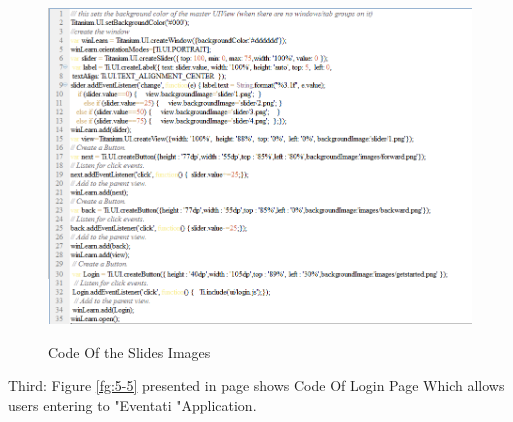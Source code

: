 \documentclass[12pt,a4paper,class,twoside,openany]{report}
\begin{document}
{\begin{figure}
\begin{center}
{\includegraphics[height=5 in]{5-4}
}
\caption{Code Of the Slides Images}
\label{fg:5-4}
\end{center}
\end{figure}
Third:
Figure \ref{fg:5-5} presented in page \pageref{fg:5-5}shows Code Of Login Page Which allows users entering to "Eventati "Application.
\begin{figure}
\begin{center}
\end{center}
\end{figure}}
\end{document}
